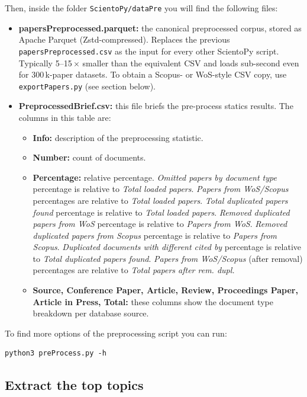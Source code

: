 \documentclass[10pt,letterpaper]{article}
\begin{document}
Then, inside the folder \verb|ScientoPy/dataPre| you will find the following files:
\begin{itemize}
\item \textbf{papersPreprocessed.parquet:} the canonical preprocessed corpus, stored as Apache Parquet (Zstd-compressed). Replaces the previous \verb|papersPreprocessed.csv| as the input for every other ScientoPy script. Typically 5--15\,$\times$ smaller than the equivalent CSV and loads sub-second even for 300\,k-paper datasets. To obtain a Scopus- or WoS-style CSV copy, use \verb|exportPapers.py| (see section below).
\item \textbf{PreprocessedBrief.csv:} this file briefs the pre-process statics results. The columns in this table are:
\begin{itemize}
\item \textbf{Info:} description of the preprocessing statistic.
\item \textbf{Number:} count of documents.
\item \textbf{Percentage:} relative percentage. \textit{Omitted papers by document type} percentage is relative to \textit{Total loaded papers}. \textit{Papers from WoS/Scopus} percentages are relative to \textit{Total loaded papers}. \textit{Total duplicated papers found} percentage is relative to \textit{Total loaded papers}. \textit{Removed duplicated papers from WoS} percentage is relative to \textit{Papers from WoS}. \textit{Removed duplicated papers from Scopus} percentage is relative to \textit{Papers from Scopus}. \textit{Duplicated documents with different cited by} percentage is relative to \textit{Total duplicated papers found}. \textit{Papers from WoS/Scopus} (after removal) percentages are relative to \textit{Total papers after rem. dupl.}
\item \textbf{Source, Conference Paper, Article, Review, Proceedings Paper, Article in Press, Total:} these columns show the document type breakdown per database source.
\end{itemize}
\end{itemize}

To find more options of the preprocessing script you can run:
\begin{verbatim}
python3 preProcess.py -h
\end{verbatim}

\subsection{Extract the top topics}
\end{document}
